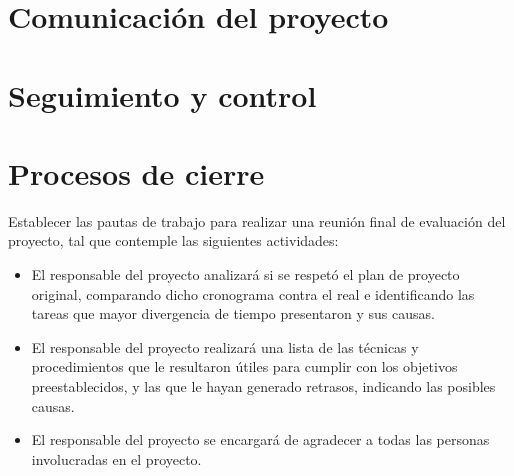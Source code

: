 \documentclass[
12pt,
spanish,
singlespacing,
parskip,
headsepline,]{article}
\begin{document}
\section{Comunicación del proyecto}

\section{Seguimiento y control}

\section{Procesos de cierre}

Establecer las pautas de trabajo para realizar una reunión final de evaluación del proyecto, tal que contemple las siguientes actividades:

\begin{itemize}
	\item El responsable del proyecto analizará si se respetó el plan de proyecto original, comparando dicho cronograma contra el real e identificando las tareas que mayor divergencia de tiempo presentaron y sus causas.
	\item El responsable del proyecto realizará una lista de las técnicas y procedimientos que le resultaron útiles para cumplir con los objetivos preestablecidos, y las que le hayan generado retrasos, indicando las posibles causas.
	\item El responsable del proyecto se encargará de agradecer a todas las personas involucradas en el proyecto.
\end{itemize}
\end{document}
